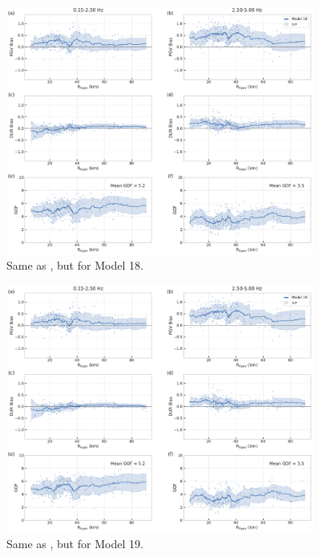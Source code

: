 \begin{figure}[!ht]
  \centering
  \includegraphics[width=0.9\textwidth,height=0.9\textheight,keepaspectratio]{figures/figure_highf_S28.pdf}
  \caption{Same as , but for Model 18.
  }
\label{fig:highf-S28}
\end{figure}
\clearpage


\begin{figure}[!ht]
  \centering
  \includegraphics[width=0.9\textwidth,height=0.9\textheight,keepaspectratio]{figures/figure_highf_S29.pdf}
  \caption{Same as , but for Model 19.
  }
\label{fig:highf-S29}
\end{figure}
\clearpage


